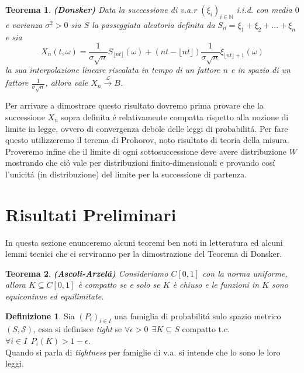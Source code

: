 \documentclass[11pt, twoside]{report}
\theoremstyle{definition}
\newtheorem{definizione}{Definizione}[chapter]
\theoremstyle{plain}
\newtheorem{teo}{Teorema}[chapter]
\theoremstyle{remark}
\numberwithin{equation}{chapter}
\begin{document}
\begin{teo}{\textbf{(Donsker)}} \label{donsker} Data la successione di v.a.r $(\xi_i)_{i \in \mathbb N}$ i.i.d. con media $0$ e varianza $\sigma^2>0$ sia $S$ la passeggiata aleatoria definita da $ S_n= \xi_1 + \xi_2 + ... + \xi_n$ e sia
\begin{equation}
X_n(t,\omega)=\frac{1}{\sigma \sqrt{n}}S_{\lfloor nt \rfloor}(\omega)+\left(nt - \lfloor nt \rfloor \right) \frac{1}{\sigma \sqrt n}\xi_{ \lfloor nt \rfloor +1 }(\omega)
\end{equation}
la sua interpolazione lineare riscalata in tempo di un fattore $n$ e in spazio di un fattore $\frac{1}{\sigma \sqrt{n}}$, allora vale $X_n \xrightarrow{\mathscr{L}} B $.
\end{teo}

Per arrivare a dimostrare questo risultato dovremo prima provare che la successione $X_n$ sopra definita \'e relativamente compatta rispetto alla nozione di limite in legge, ovvero di convergenza debole delle leggi di probabilit\'a. Per fare questo utilizzeremo il terema di Prohorov, noto risultato di teoria della misura. Proveremo infine che il limite di ogni sottosuccessione deve avere distribuzione $W$ mostrando che ci\'o vale per distribuzioni finito-dimensionali e provando cos\'i l'unicit\'a (in distribuzione) del limite per la successione di partenza.

\section{Risultati Preliminari}
In questa sezione enunceremo alcuni teoremi ben noti in letteratura ed alcuni lemmi tecnici che ci serviranno per la dimostrazione del Teorema di Donsker.

\begin{teo}{\textbf{(Ascoli-Arzel\'a)}} Consideriamo $C[0,1]$ con la norma uniforme, allora $K \subseteq C[0,1]$ è compatto se e solo se $K$ è chiuso e le funzioni in $K$ sono equiconinue ed equilimitate.
\end{teo}

\begin{definizione} Sia $(P_i)_{i \in I}$ una famiglia di probabilit\'a sulo spazio metrico $(S,\mathscr{S})$, essa si definisce \textit{tight} se $\forall \epsilon > 0 \ \ \exists K \subseteq S$ compatto t.c. $ \forall i \in I \ \ P_i (K)> 1- \epsilon $.
\\Quando si parla di \textit{tightness} per famiglie di v.a. si intende che lo sono le loro leggi.
\end{definizione}
\end{document}
